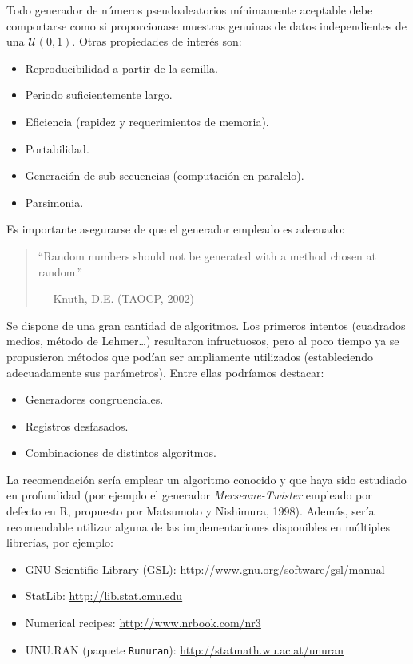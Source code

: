\documentclass[
]{book}
\theoremstyle{break}
\theoremstyle{nonumberplain}
\begin{document}
Todo generador de números pseudoaleatorios mínimamente aceptable debe comportarse como si proporcionase muestras genuinas de datos independientes de una \(\mathcal{U}(0,1)\).
Otras propiedades de interés son:

\begin{itemize}
\item
  Reproducibilidad a partir de la semilla.
\item
  Periodo suficientemente largo.
\item
  Eficiencia (rapidez y requerimientos de memoria).
\item
  Portabilidad.
\item
  Generación de sub-secuencias (computación en paralelo).
\item
  Parsimonia.
\end{itemize}

Es importante asegurarse de que el generador empleado es adecuado:

\begin{quote}
``Random numbers should not be generated with a method chosen at random.''

--- Knuth, D.E. (TAOCP, 2002)
\end{quote}

Se dispone de una gran cantidad de algoritmos.
Los primeros intentos (cuadrados medios, método de Lehmer\ldots) resultaron infructuosos, pero al poco tiempo ya se propusieron métodos que podían ser ampliamente utilizados (estableciendo adecuadamente sus parámetros).
Entre ellas podríamos destacar:

\begin{itemize}
\item
  Generadores congruenciales.
\item
  Registros desfasados.
\item
  Combinaciones de distintos algoritmos.
\end{itemize}

La recomendación sería emplear un algoritmo conocido y que haya sido estudiado en profundidad (por ejemplo el generador \emph{Mersenne-Twister} empleado por defecto en R, propuesto por Matsumoto y Nishimura, 1998).
Además, sería recomendable utilizar alguna de las implementaciones disponibles en múltiples librerías, por ejemplo:

\begin{itemize}
\item
  GNU Scientific Library (GSL):
  \href{http://www.gnu.org/software/gsl/manual/html_node/Random-Number-Generation.html}{http://www.gnu.org/software/gsl/manual}
\item
  StatLib: \url{http://lib.stat.cmu.edu}
\item
  Numerical recipes: \url{http://www.nrbook.com/nr3}
\item
  UNU.RAN (paquete \texttt{Runuran}):
  \url{http://statmath.wu.ac.at/unuran}
\end{itemize}
\end{document}
